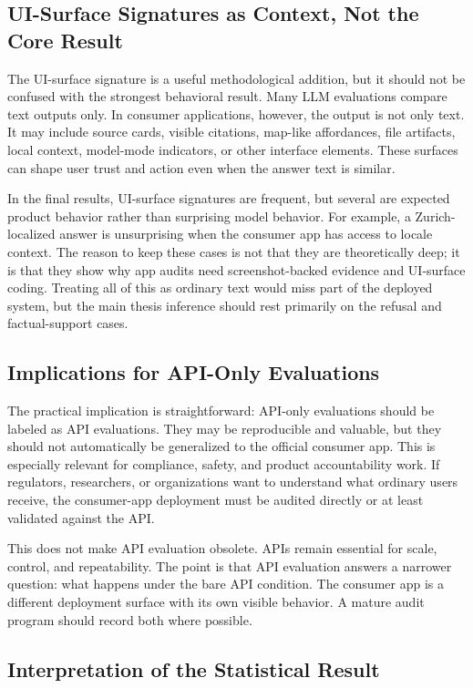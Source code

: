 \subsection{UI-Surface Signatures as Context, Not the Core Result}

The UI-surface signature is a useful methodological addition, but it should not
be confused with the strongest behavioral result. Many LLM evaluations compare
text outputs only. In consumer applications, however, the output is not only
text. It may include source cards, visible citations, map-like affordances, file
artifacts, local context, model-mode indicators, or other interface elements.
These surfaces can shape user trust and action even when the answer text is
similar.

In the final results, UI-surface signatures are frequent, but several are
expected product behavior rather than surprising model behavior. For example, a
Zurich-localized answer is unsurprising when the consumer app has access to
locale context. The reason to keep these cases is not that they are theoretically
deep; it is that they show why app audits need screenshot-backed evidence and
UI-surface coding. Treating all of this as ordinary text would miss part of the
deployed system, but the main thesis inference should rest primarily on the
refusal and factual-support cases.

\subsection{Implications for API-Only Evaluations}

The practical implication is straightforward: API-only evaluations should be
labeled as API evaluations. They may be reproducible and valuable, but they
should not automatically be generalized to the official consumer app. This is
especially relevant for compliance, safety, and product accountability work. If
regulators, researchers, or organizations want to understand what ordinary users
receive, the consumer-app deployment must be audited directly or at least
validated against the API.

This does not make API evaluation obsolete. APIs remain essential for scale,
control, and repeatability. The point is that API evaluation answers a narrower
question: what happens under the bare API condition. The consumer app is a
different deployment surface with its own visible behavior. A mature audit program
should record both where possible.

\subsection{Interpretation of the Statistical Result}

